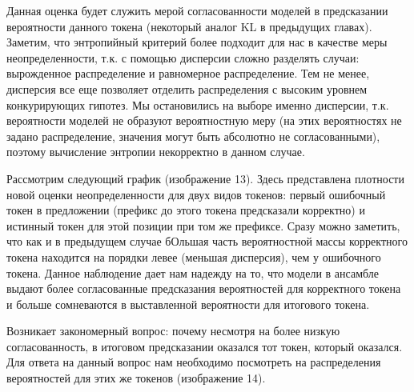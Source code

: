 \documentclass[a4paper,14pt]{extarticle}
\begin{document}
	Данная оценка будет служить мерой согласованности моделей в предсказании вероятности данного токена (некоторый аналог KL в предыдущих главах). Заметим, что энтропийный критерий более подходит для нас в качестве меры неопределенности, т.к. с помощью дисперсии сложно разделять случаи: вырожденное распределение и равномерное распределение. Тем не менее, дисперсия все еще позволяет отделить распределения с высоким уровнем конкурирующих гипотез. Мы остановились на выборе именно дисперсии, т.к. вероятности моделей не образуют вероятностную меру (на этих вероятностях не задано распределение, значения могут быть абсолютно не согласованными), поэтому вычисление энтропии некорректно в данном случае.
	
	\begin{figure}[t]
	\end{figure}
	Рассмотрим следующий график (изображение 13). Здесь представлена плотности новой оценки неопределенности для двух видов токенов: первый ошибочный токен в предложении (префикс до этого токена предсказали корректно) и истинный токен для этой позиции при том же префиксе. Сразу можно заметить, что как и в предыдущем случае бОльшая часть вероятностной массы корректного токена находится на порядки левее (меньшая дисперсия), чем у ошибочного токена. Данное наблюдение дает нам надежду на то, что модели в ансамбле выдают более согласованные предсказания вероятностей для корректного токена и больше сомневаются в выставленной вероятности для итогового токена.
	
	Возникает закономерный вопрос: почему несмотря на более низкую согласованность, в итоговом предсказании оказался тот токен, который оказался. Для ответа на данный вопрос нам необходимо посмотреть на распределения вероятностей для этих же токенов (изображение 14).
	
\end{document}
